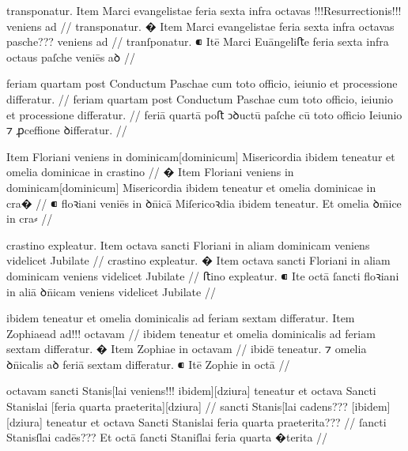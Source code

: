 \ex \bg
\gla
{}
transponatur.
{} Item Marci evangelistae feria sexta infra octavas !!!Resurrectionis!!! {}
veniens ad
//
\glRekonstrukcja
{}
transponatur.
� Item Marci evangelistae feria sexta infra octavas {} pasche???
veniens ad
//
\glU
{}
tranſponatur. ⁌ Itē Marci Euāngeliﬅe feria sexta infra octaus {} paſche veniēs aꝺ
//
\endgl
\eg



\ex \bg
\gla
{}
feriam quartam post Conductum Paschae cum toto officio,
ieiunio et processione differatur.
//
\glRekonstrukcja
{}
feriam quartam post Conductum Paschae cum toto officio,
ieiunio et processione differatur.
//
\glU
{}
feriā quartā poﬅ ↄꝺuctū paſche cū toto oﬀicio Ieiunio ⁊ ꝓceﬀione ꝺiﬀeratur.
//
\endgl
\eg



\ex \bg
\gla
{}
{} Item Floriani veniens in dominicam[dominicum] Misericordia ibidem teneatur
et omelia dominicae in crastino
//
\glRekonstrukcja
{}
� Item Floriani veniens in dominicam[dominicum] Misericordia ibidem teneatur
et omelia dominicae in cra�
//
\glU
{}
⁌ {} floꝛiani veniēs in ꝺn̄icā Miſericoꝛdia ibidem teneatur. Et omelia ꝺm̄ice in cra⸗
//
\endgl
\eg




\ex \bg
\gla
{}
crastino expleatur.
{} Item octava sancti Floriani in aliam dominicam veniens videlicet
Jubilate
//
\glRekonstrukcja
{}
crastino expleatur.
� Item octava sancti Floriani in aliam dominicam veniens videlicet
Jubilate
//
\glU
{}
ﬅino expleatur. ⁌ Ite octā ſancti floꝛiani in aliā ꝺn̄icam veniens videlicet Jubilate
//
\endgl
\eg


\ex \bg
\gla
{}
ibidem teneatur et omelia dominicalis ad feriam sextam differatur.
{} Item Zophiaead ad!!! {} octavam 
//
\glRekonstrukcja
{}
ibidem teneatur et omelia dominicalis ad feriam sextam differatur.
� Item Zophiae {} in octavam 
//
\glU
{}
ibidē teneatur. ⁊ omelia ꝺn̄icalis aꝺ feriā sextam diﬀeratur. ⁌ Itē Zophie {} in octā
//
\endgl
\eg



\ex \bg
\gla
{}
octavam sancti Stanis[lai veniens!!! {} ibidem][dziura] teneatur et octava Sancti Stanislai [feria quarta praeterita][dziura]
//
\glRekonstrukcja
{}
{} sancti Stanis[lai {} cadens??? [ibidem][dziura] teneatur et octava Sancti Stanislai feria quarta praeterita???
//
\glU
{}
{} ſancti Stanisſlai {} cadēs???   Et octā ſancti Staniſlai feria quarta �terita
//
\endgl
\eg



